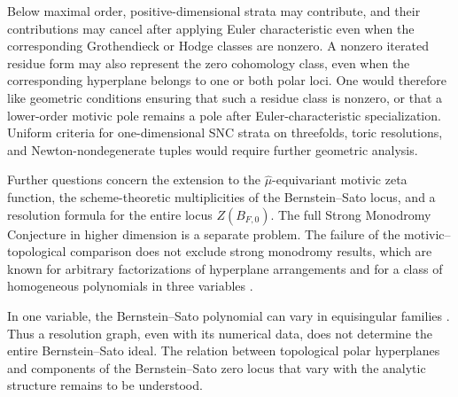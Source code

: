 \documentclass[12pt]{amsart}
\numberwithin{equation}{section}
\theoremstyle{plain}
\theoremstyle{definition}
\theoremstyle{remark}
\theoremstyle{definition}
\begin{document}
Below maximal order, positive-dimensional strata may contribute, and their contributions may cancel after applying Euler characteristic even when the corresponding Grothendieck or Hodge classes are nonzero. A nonzero iterated residue form may also represent the zero cohomology class, even when the corresponding hyperplane belongs to one or both polar loci. One would therefore like geometric conditions ensuring that such a residue class is nonzero, or that a lower-order motivic pole remains a pole after Euler-characteristic specialization. Uniform criteria for one-dimensional SNC strata on threefolds, toric resolutions, and Newton-nondegenerate tuples would require further geometric analysis.

Further questions concern the extension to the $\widehat\mu$-equivariant motivic zeta function, the scheme-theoretic multiplicities of the Bernstein--Sato locus, and a resolution formula for the entire locus $Z(B_{F,0})$. The full Strong Monodromy Conjecture in higher dimension is a separate problem. The failure of the motivic--topological comparison does not exclude strong monodromy results, which are known for arbitrary factorizations of hyperplane arrangements \cite{DavisYang2026} and for a class of homogeneous polynomials in three variables \cite{BathVeys2026}.

In one variable, the Bernstein--Sato polynomial can vary in equisingular families \cite[Example~1]{Oaku2022}. Thus a resolution graph, even with its numerical data, does not determine the entire Bernstein--Sato ideal. The relation between topological polar hyperplanes and components of the Bernstein--Sato zero locus that vary with the analytic structure remains to be understood.







\end{document}
